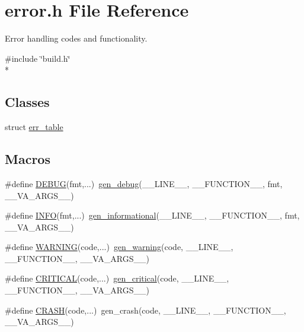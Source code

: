 \section{error.\-h File Reference}
\label{error_8h}


Error handling codes and functionality.  


{\ttfamily \#include \char`\"{}build.\-h\char`\"{}}\\*
\subsection*{Classes}
\begin{DoxyCompactItemize}
\item 
struct \hyperlink{structerr__table}{err\-\_\-table}
\end{DoxyCompactItemize}
\subsection*{Macros}
\begin{DoxyCompactItemize}
\item 
\#define \hyperlink{error_8h_ad96d3a6cf3e98ce15febe3d27bda47bc}{D\-E\-B\-U\-G}(fmt,...)~\hyperlink{error_8h_a9a006343667fc7ba3700717a088db087}{gen\-\_\-debug}(\-\_\-\-\_\-\-L\-I\-N\-E\-\_\-\-\_\-, \-\_\-\-\_\-\-F\-U\-N\-C\-T\-I\-O\-N\-\_\-\-\_\-, fmt, \-\_\-\-\_\-\-V\-A\-\_\-\-A\-R\-G\-S\-\_\-\-\_\-)
\item 
\#define \hyperlink{error_8h_ab56f6599fb46785e4265a3033ba91aa6}{I\-N\-F\-O}(fmt,...)~\hyperlink{error_8h_a8766f7f2f28c3dcb552239443cbb1df6}{gen\-\_\-informational}(\-\_\-\-\_\-\-L\-I\-N\-E\-\_\-\-\_\-, \-\_\-\-\_\-\-F\-U\-N\-C\-T\-I\-O\-N\-\_\-\-\_\-, fmt, \-\_\-\-\_\-\-V\-A\-\_\-\-A\-R\-G\-S\-\_\-\-\_\-)
\item 
\#define \hyperlink{error_8h_a3d983c23dcde2214196de705199df014}{W\-A\-R\-N\-I\-N\-G}(code,...)~\hyperlink{error_8h_a41deb0a263cb65f98cded303082fc4e0}{gen\-\_\-warning}(code, \-\_\-\-\_\-\-L\-I\-N\-E\-\_\-\-\_\-, \-\_\-\-\_\-\-F\-U\-N\-C\-T\-I\-O\-N\-\_\-\-\_\-, \-\_\-\-\_\-\-V\-A\-\_\-\-A\-R\-G\-S\-\_\-\-\_\-)
\item 
\#define \hyperlink{error_8h_aa8550f01fb0541ab39136f9e8a9d57fb}{C\-R\-I\-T\-I\-C\-A\-L}(code,...)~\hyperlink{error_8h_ad7abb0eedaaa25e5cce2141a13bd4af5}{gen\-\_\-critical}(code, \-\_\-\-\_\-\-L\-I\-N\-E\-\_\-\-\_\-, \-\_\-\-\_\-\-F\-U\-N\-C\-T\-I\-O\-N\-\_\-\-\_\-, \-\_\-\-\_\-\-V\-A\-\_\-\-A\-R\-G\-S\-\_\-\-\_\-)
\item 
\#define \hyperlink{error_8h_a41e09f159e79a4614feeb1ad7880b261}{C\-R\-A\-S\-H}(code,...)~gen\-\_\-crash(code, \-\_\-\-\_\-\-L\-I\-N\-E\-\_\-\-\_\-, \-\_\-\-\_\-\-F\-U\-N\-C\-T\-I\-O\-N\-\_\-\-\_\-, \-\_\-\-\_\-\-V\-A\-\_\-\-A\-R\-G\-S\-\_\-\-\_\-)
\end{DoxyCompactItemize}
